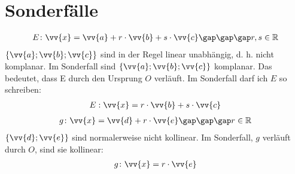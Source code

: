 \section{Sonderfälle}
\begin{gather*}
  E \colon \vv{x} = \vv{a} + r \cdot \vv{b} + s \cdot \vv{c} \gap\gap\gap r, s \in \mathbb{R}
\end{gather*}
$\{\vv{a}; \vv{b}; \vv{c}\}$ sind in der Regel linear unabhängig, d. h. nicht komplanar. Im Sonderfall sind $\{\vv{a}; \vv{b}; \vv{c}\}$ komplanar. Das bedeutet, dass E durch den Ursprung $O$ verläuft. Im Sonderfall darf ich $E$ so schreiben:
\begin{gather*}
  E: \vv{x} = r \cdot \vv{b} + s \cdot \vv{c}
\end{gather*}
\begin{gather*}
  g \colon \vv{x} = \vv{d} + r \cdot \vv{e} \gap\gap\gap r \in \mathbb{R}
\end{gather*}
$\{\vv{d}; \vv{e}\}$ sind normalerweise nicht kollinear. Im Sonderfall, $g$ verläuft durch $O$, sind sie kollinear:
\begin{gather*}
  g \colon \vv{x} = r \cdot \vv{e}
\end{gather*}
